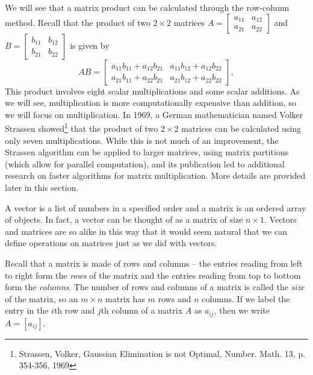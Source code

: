 We will see that a matrix product can be calculated through the row-column method. Recall that the product of two $2 \times 2$ matrices $A = \left[ \begin{array}{cc} a_{11}&a_{12}\\a_{21}&a_{22} \end{array} \right]$ and $B = \left[ \begin{array}{cc} b_{11}&b_{12}\\b_{21}&b_{22} \end{array} \right]$ is given by 
\[AB = \left[ \begin{array}{cc} a_{11}b_{11}+a_{12}b_{21} & a_{11}b_{12}+a_{12}b_{22} \\ a_{21}b_{11}+a_{22}b_{21} & a_{21}b_{12}+a_{22}b_{22} \end{array} \right],\]
This product involves eight scalar multiplications and some scalar additions. As we will see, multiplication is more computationally expensive than addition, so we will focus on multiplication. In 1969, a German mathematician named Volker Strassen showed\footnote{Strassen, Volker, Gaussian Elimination is not Optimal, Number. Math. 13, p. 354-356, 1969} that the product of two $2 \times 2$ matrices can be calculated using only seven multiplications. While this is not much of an improvement, the Strassen algorithm can be applied to larger matrices, using matrix partitions (which allow for parallel computation), and its publication led to additional research on faster algorithms for matrix multiplication. More details are provided later in this section. 



\label{sec:mtx_ops_intro}

A vector is a list of numbers in a specified order and a matrix is an ordered array of objects. In fact, a vector can be thought of as a matrix of size $n \times 1$. Vectors and matrices are so alike in this way that it would seem natural that we can define operations on matrices just as we did with vectors. 

Recall that a matrix is made of rows and columns -- the entries reading from left to right form the \emph{rows} of the matrix and the entries reading from top to bottom form the \emph{columns}. The number of rows and columns of a matrix is called the \emph{size} of the matrix, so an $m \times n$ matrix has $m$ rows and $n$ columns. If we label the entry in the $i$th row and $j$th column of a matrix $A$ as $a_{ij}$, then we write $A = [a_{ij}]$. 


